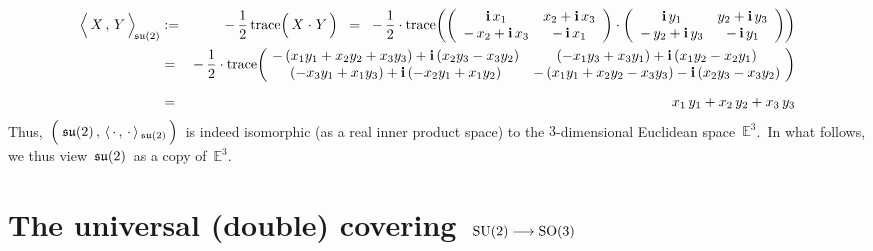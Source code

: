 \begin{eqnarray*}
\left\langle\,
	\overset{{\color{white}.}}{X}
	\, , \,
	Y
	\,\right\rangle_{\!\su(2)}
& := &
	-\,\dfrac{1}{2}\,
	\trace\!\left(\,X \overset{{\color{white}1}}{\cdot} Y\,\right)
\;\; = \;\;
	-\,\dfrac{1}{2}\cdot\trace\!\left(
		\left(\begin{array}{cc}
			\i\,x_{1} & x_{2} + \i\,x_{3}
			\\
			- \, x_{2} + \i\,x_{3} & -\,\i\,x_{1}
			\end{array}\right)
		\cdot
		\left(\begin{array}{cc}
			\i\,y_{1} & y_{2} + \i\,y_{3}
			\\
			- \, y_{2} + \i\,y_{3} & -\,\i\,y_{1}
			\end{array}\right)
		\right)
\\
& = &
	-\,\dfrac{1}{2}\cdot\trace\!\left(\!
		\begin{array}{cc}
			-\,(x_{1}y_{1} + x_{2}y_{2} + x_{3}y_{3}) + \i\,(x_{2}y_{3}-x_{3}y_{2}) & (-x_{1}y_{3}+x_{3}y_{1}) + \i\,(x_{1}y_{2} - x_{2}y_{1})
			\\
			(-x_{3}y_{1}+x_{1}y_{3}) + \i\,(-x_{2}y_{1}+x_{1}y_{2}) & -\,(x_{1}y_{1} + x_{2}y_{2} - x_{3}y_{3}) - \i\,(x_{2}y_{3}-x_{3}y_{2})
			\end{array}
		\!\right)
\\
& = &
	\overset{{\color{white}1}}{x_{1}\,y_{1} + x_{2}\,y_{2} + x_{3}\,y_{3}}
\end{eqnarray*}
Thus,
\,$\left(\;\overset{{\color{white}.}}{\su(2)}\,,\,\langle\,\cdot\,,\,\cdot\,\rangle_{\,\su(2)}\,\right)$\,
is indeed isomorphic (as a real inner product space) to the $3$-dimensional Euclidean space \,$\mathbb{E}^{3}$.\,
In what follows, we thus view \,$\mathfrak{su}(2)$\, as a copy of \,$\mathbb{E}^{3}$.\,


\vskip 1.0cm
\section{The universal (double) covering \,$\textnormal{SU}(2) \longrightarrow \textnormal{SO}(3)$}


